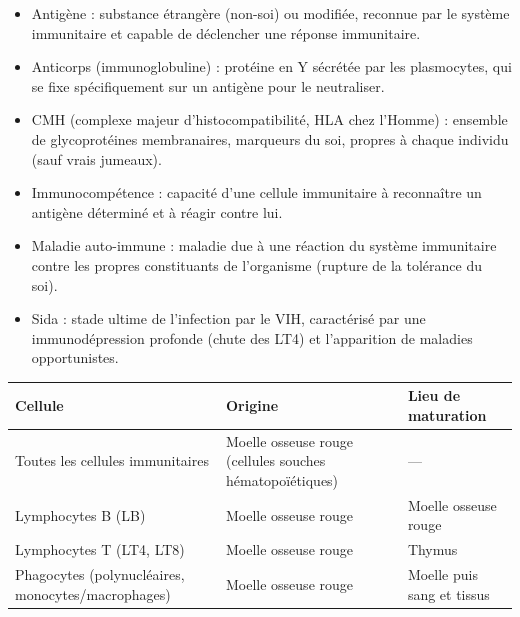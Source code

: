 \documentclass[11pt]{article}
\newcommand{\cle}[1]{{\popxbold\color{popdark}#1}}
\begin{document}
\begin{aretenir}
\begin{itemize}
\item \cle{Antigène} : substance étrangère (non-soi) ou modifiée, reconnue par le système immunitaire et capable de déclencher une réponse immunitaire.
\item \cle{Anticorps} (immunoglobuline) : protéine en Y sécrétée par les plasmocytes, qui se fixe spécifiquement sur un antigène pour le neutraliser.
\item \cle{CMH} (complexe majeur d'histocompatibilité, HLA chez l'Homme) : ensemble de glycoprotéines membranaires, marqueurs du \cle{soi}, propres à chaque individu (sauf vrais jumeaux).
\item \cle{Immunocompétence} : capacité d'une cellule immunitaire à reconnaître un antigène déterminé et à réagir contre lui.
\item \cle{Maladie auto-immune} : maladie due à une réaction du système immunitaire contre les propres constituants de l'organisme (rupture de la tolérance du soi).
\item \cle{Sida} : stade ultime de l'infection par le VIH, caractérisé par une immunodépression profonde (chute des LT4) et l'apparition de maladies opportunistes.
\end{itemize}
\end{aretenir}

\begin{aretenir}
\begin{center}
\begin{tabularx}{\linewidth}{|l|X|X|}
\hline
\rowcolor{popblueL} \textbf{Cellule} & \textbf{Origine} & \textbf{Lieu de maturation} \\
\hline
Toutes les cellules immunitaires & Moelle osseuse rouge (cellules souches hématopoïétiques) & --- \\
\hline
Lymphocytes B (LB) & Moelle osseuse rouge & Moelle osseuse rouge \\
\hline
Lymphocytes T (LT4, LT8) & Moelle osseuse rouge & Thymus \\
\hline
Phagocytes (polynucléaires, monocytes/macrophages) & Moelle osseuse rouge & Moelle puis sang et tissus \\
\hline
\end{tabularx}
\end{center}
\end{aretenir}
\end{document}
